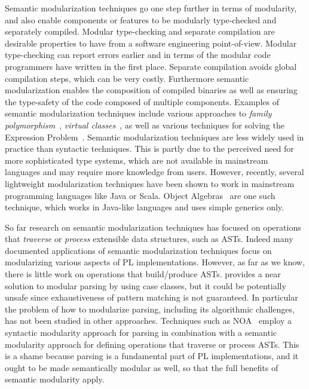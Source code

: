 Semantic modularization techniques go one step further in terms of modularity,
and also enable components or features to be modularly type-checked
and separately compiled. Modular type-checking and separate
compilation are desirable properties to have from a software
engineering point-of-view. Modular type-checking can report errors
earlier and in terms of the modular code programmers have written
in the first place. Separate compilation avoids global compilation
steps, which can be very costly. Furthermore semantic modularization
enables the composition of compiled binaries as well as ensuring the
type-safety of the code composed of multiple components. Examples of semantic modularization techniques
include various approaches to \emph{family polymorphism}~\cite{ernst01FP},
\emph{virtual classes}~\cite{Ernst:2006}, as
well as various techniques for solving the Expression
Problem~\cite{torgersen2004expression,odersky2005independently,Oliveira:2012,wang2016expression}.
Semantic modularization techniques are less widely used in practice
than syntactic techniques. This is partly due to the perceived need for more
sophisticated type systems, which are not available in mainstream
languages and may require more knowledge from users. However, recently,
several lightweight modularization techniques have been shown to work
in mainstream programming languages like Java or Scala. Object
Algebras~\cite{Oliveira:2012} are one such technique, which works in
Java-like languages and uses simple generics only.

So far research on semantic modularization techniques has focused on
operations that \emph{traverse} or \emph{process} extensible
data structures, such as ASTs. Indeed many documented applications of
semantic modularization techniques focus on modularizing various
aspects of PL implementations.  However, as far as we know, there is
little work on operations that build/produce ASTs. \cite{SLOANE201520}
provides a near solution to modular parsing by using case classes, but
it could be potentially unsafe since exhaustiveness of pattern matching
is not guaranteed. In particular the
problem of how to modularize parsing, including its algorithmic challenges,
has not been studied in other approaches. Techniques such as NOA~\cite{Gouseti2014}
employ a syntactic modularity approach for parsing in combination with
a semantic modularity approach for defining operations
that traverse or process ASTs. This is a shame because parsing is a
fundamental part of PL implementations, and it ought to be made
semantically modular as well, so that the full benefits of semantic
modularity apply.

